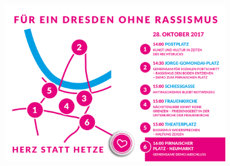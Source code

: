 \documentclass[onlymath]{beamer}
\begin{document}
\maketitle

\begin{frame}\frametitle{}

\includegraphics[width=10cm]{images/herz}

\end{frame}

\end{document}
